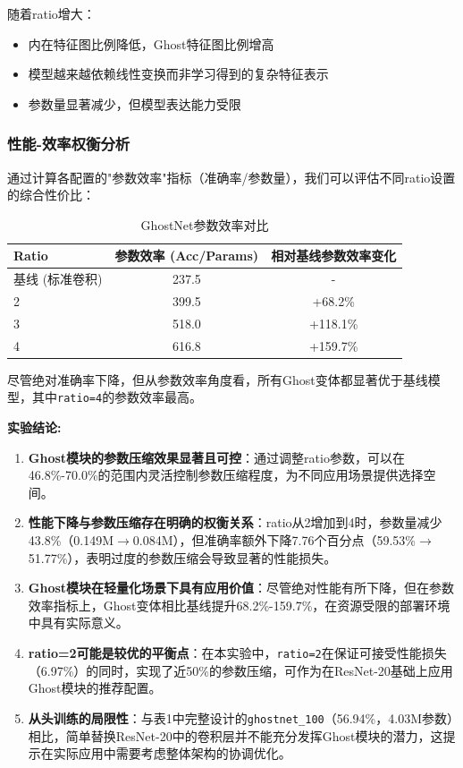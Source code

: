 \documentclass[a4paper]{article}
\begin{document}
随着ratio增大：
\begin{itemize}
    \item 内在特征图比例降低，Ghost特征图比例增高
    \item 模型越来越依赖线性变换而非学习得到的复杂特征表示
    \item 参数量显著减少，但模型表达能力受限
\end{itemize}

\subsubsection{性能-效率权衡分析}

通过计算各配置的"参数效率"指标（准确率/参数量），我们可以评估不同ratio设置的综合性价比：

\begin{table}[H]
\centering
\caption{GhostNet参数效率对比}
\begin{tabular}{lcc}
\toprule
\textbf{Ratio} & \textbf{参数效率 (Acc/Params)} & \textbf{相对基线参数效率变化} \\
\midrule
基线 (标准卷积) & 237.5 & - \\
2 & 399.5 & +68.2\% \\
3 & 518.0 & +118.1\% \\
4 & 616.8 & +159.7\% \\
\bottomrule
\end{tabular}
\end{table}

尽管绝对准确率下降，但从参数效率角度看，所有Ghost变体都显著优于基线模型，其中\texttt{ratio=4}的参数效率最高。

\textbf{实验结论:}

\begin{enumerate}
    \item \textbf{Ghost模块的参数压缩效果显著且可控}：通过调整ratio参数，可以在46.8\%-70.0\%的范围内灵活控制参数压缩程度，为不同应用场景提供选择空间。

    \item \textbf{性能下降与参数压缩存在明确的权衡关系}：ratio从2增加到4时，参数量减少43.8\%（0.149M$\rightarrow$0.084M），但准确率额外下降7.76个百分点（59.53\%$\rightarrow$51.77\%），表明过度的参数压缩会导致显著的性能损失。

    \item \textbf{Ghost模块在轻量化场景下具有应用价值}：尽管绝对性能有所下降，但在参数效率指标上，Ghost变体相比基线提升68.2\%-159.7\%，在资源受限的部署环境中具有实际意义。

    \item \textbf{ratio=2可能是较优的平衡点}：在本实验中，\texttt{ratio=2}在保证可接受性能损失（6.97\%）的同时，实现了近50\%的参数压缩，可作为在ResNet-20基础上应用Ghost模块的推荐配置。

    \item \textbf{从头训练的局限性}：与表1中完整设计的\texttt{ghostnet\_100}（56.94\%，4.03M参数）相比，简单替换ResNet-20中的卷积层并不能充分发挥Ghost模块的潜力，这提示在实际应用中需要考虑整体架构的协调优化。
\end{enumerate}
\end{document}
